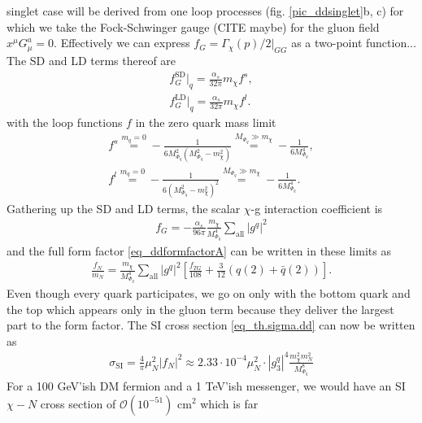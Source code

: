 singlet case will be derived from one loop processes (fig. \ref{pic_ddsinglet}b, c) 
for which we take the Fock-Schwinger gauge (CITE maybe) for the gluon
field $x^\mu G^a_\mu = 0$. Effectively we can express $f_G = \Gamma_\chi(p)/2|_{GG}$ as a two-point function... The SD and LD terms thereof are
\begin{align}
 f_G^\text{SD}|_q = \frac{\alpha_s}{32\pi} m_\chi f^s,\\
 f_G^\text{LD}|_q = \frac{\alpha_s}{32\pi} m_\chi f^l.
\end{align}
with the loop functions $f$ in the zero quark mass limit
\begin{align}
 f^s \stackrel{m_q=0}{=} - \frac{1}{6M_{\Phi_q}^2\left(M_{\Phi_q}^2-m_\chi^2\right)} \stackrel{M_{\Phi_q}\gg m_\chi}{=} -\frac{1}{6M_{\Phi_q}^4},\\
 f^l \stackrel{m_q=0}{=} - \frac{1}{6\left(M_{\Phi_q}^2-m_\chi^2\right)^2}  \stackrel{M_{\Phi_q}\gg m_\chi}{=} -\frac{1}{6M_{\Phi_q}^4}.
\end{align}
Gathering up the SD and LD terms, the scalar $\chi$-g interaction coefficient is
\begin{align}
 f_G = -\frac{\alpha_s}{96\pi} \frac{m_\chi}{M_{\Phi_q}^4} \sum\limits_{\text{all}} |g^q|^2
\end{align}
and the full form factor \eqref{eq_ddformfactorA} can be written in these limits as
\begin{align}
 \frac{f_N}{m_N} = \frac{m_\chi}{M_{\Phi_q}^4} \sum\limits_\text{all} \left|g^q\right|^2 \left[\frac{f_{TG}}{108} + \frac{3}{12}\left(q(2) + \bar q(2)\right)\right].
\end{align}
Even though every quark participates, we go on only with the bottom quark and the top which appears only in the gluon term because they deliver the
largest part to the form factor. The SI cross section \eqref{eq_th.sigma.dd} can now be written as
\begin{align}
 \sigma_\text{SI} = \frac{4}{\pi}\mu_N^2 \left| f_N \right| ^2 \approx 2.33\cdot 10^{-4} \mu_N^2 \cdot |g^q_3|^4 \frac{m_\chi^2 m_N^2}{M_{\Phi_q}^8}
 \label{eq_sigmaDDA}
\end{align}
For a 100 GeV'ish DM fermion and a 1 TeV'ish messenger, we would have an SI $\chi-N$ cross section of $\mathcal{O}(10^{-51})$ cm$^2$ which is far 
